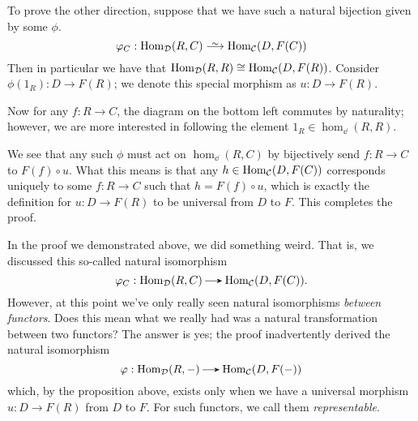 \begin{prf}
        To prove the other direction, suppose that we have such a natural bijection given by some $\phi$.
        \[
            \phi_{C}: \hom_{\dd}(R, C) \isomarrow \hom_{\cc}(D, F(C))
        \]
        Then in particular 
        we have that $\operatorname{\mathrm{Hom}}_{\mathcal{D}}(R, R) \cong \operatorname{\mathrm{Hom}}_{\mathcal{C}}(D, F(R))$. 
        Consider $\phi(1_R): D \to F(R)$; we denote this special 
        morphism as $u: D \to F(R)$. 

        Now for any $f: R \to C$,
        the diagram on the bottom left commutes by naturality; 
        however, we are more interested in following the element 
        $1_R \in \hom_{\dd}(R, R)$. 
        \begin{center}
            \hspace{1cm}
        \end{center}
        We see that any such $\phi$ must act on $\hom_{\dd}(R, C)$ 
        by bijectively send $f: R \to C$ to $F(f) \circ u$. What this 
        means is that any $h \in \operatorname{\mathrm{Hom}}_{\mathcal{C}}(D, F(C))$ corresponds uniquely 
        to some $f: R \to C$ such that $h = F(f) \circ u$, which is exactly the 
        definition for $u: D \to F(R)$ to be universal from $D$ to $F$. This 
        completes the proof.
    \end{prf}

    In the proof we demonstrated above, we did something weird. That is, we 
    discussed this so-called natural isomorphism 
    \[
        \phi_C: \hom_{\dd}(R, C) \to \hom_{\cc}(D, F(C)).
    \]
    However, at this point we've only really seen natural isomorphisms
    \emph{between functors}. Does this mean what we really had was a 
    natural transformation between two functors?
    The answer is yes; the proof inadvertently derived the natural isomorphism
    \[
        \phi: \hom_{\dd}(R, -) \to \hom_{\cc}(D, F(-))   
    \]
    which, by the proposition above, exists only when 
    we have a universal morphism $u: D \to F(R)$ from $D$ to $F$.
    For such functors, we call them \emph{representable}.

